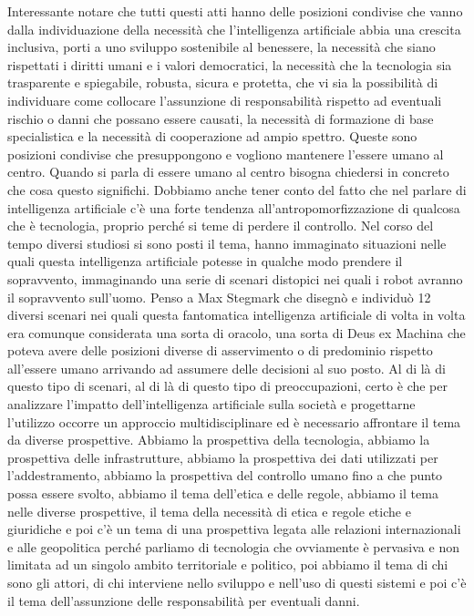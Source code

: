 Interessante notare che tutti questi atti hanno delle posizioni condivise che vanno dalla individuazione della necessità che l'intelligenza artificiale abbia una crescita inclusiva, porti a uno sviluppo sostenibile al benessere, la necessità che siano rispettati i diritti umani e i valori democratici, la necessità che la tecnologia sia trasparente e spiegabile, robusta, sicura e protetta, che vi sia la possibilità di individuare come collocare l'assunzione di responsabilità rispetto ad eventuali rischio o danni che possano essere causati, la necessità di formazione di base specialistica e la necessità di cooperazione ad ampio spettro.
Queste sono posizioni condivise che presuppongono e vogliono mantenere l'essere umano al centro.
Quando si parla di essere umano al centro bisogna chiedersi in concreto che cosa questo significhi.
Dobbiamo anche tener conto del fatto che nel parlare di intelligenza artificiale c'è una forte tendenza all'antropomorfizzazione di qualcosa che è tecnologia, proprio perché si teme di perdere il controllo.
Nel corso del tempo diversi studiosi si sono posti il tema, hanno immaginato situazioni nelle quali questa intelligenza artificiale potesse in qualche modo prendere il sopravvento, immaginando una serie di scenari distopici nei quali i robot avranno il sopravvento sull'uomo.
Penso a Max Stegmark che disegnò e individuò 12 diversi scenari nei quali questa fantomatica intelligenza artificiale di volta in volta era comunque considerata una sorta di oracolo, una sorta di Deus ex Machina che poteva avere delle posizioni diverse di asservimento o di predominio rispetto all'essere umano arrivando ad assumere delle decisioni al suo posto.
Al di là di questo tipo di scenari, al di là di questo tipo di preoccupazioni, certo è che per analizzare l'impatto dell'intelligenza artificiale sulla società e progettarne l'utilizzo occorre un approccio multidisciplinare ed è necessario affrontare il tema da diverse prospettive.
Abbiamo la prospettiva della tecnologia, abbiamo la prospettiva delle infrastrutture, abbiamo la prospettiva dei dati utilizzati per l'addestramento, abbiamo la prospettiva del controllo umano fino a che punto possa essere svolto, abbiamo il tema dell'etica e delle regole, abbiamo il tema nelle diverse prospettive, il tema della necessità di etica e regole etiche e giuridiche  e poi c'è un tema di una prospettiva legata alle relazioni internazionali e alle geopolitica perché parliamo di tecnologia che ovviamente è pervasiva e non limitata ad un singolo ambito territoriale e politico, poi abbiamo il tema di chi sono gli attori, di chi interviene nello sviluppo e nell'uso di questi sistemi e poi c'è il tema dell'assunzione delle responsabilità per eventuali danni.
